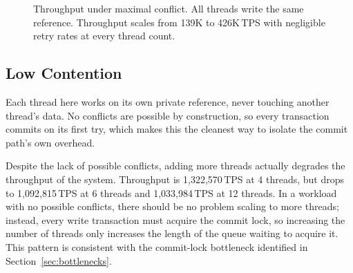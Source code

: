 \begin{figure}[H]
  \centering
  \caption{Throughput under maximal conflict. All threads write the same
    reference. Throughput scales from 139K to 426K\,TPS with negligible
    retry rates at every thread count.}
  \label{fig:throughput-high-contention}
\end{figure}

\subsection{Low Contention}

Each thread here works on its own private reference, never touching another
thread's data. No conflicts are possible by construction, so every
transaction commits on its first try, which makes this the cleanest way to
isolate the commit path's own overhead.

Despite the lack of possible conflicts, adding more threads actually
degrades the throughput of the system. Throughput is 1,322,570\,TPS at
4 threads, but drops to 1,092,815\,TPS at 6 threads and 1,033,984\,TPS
at 12 threads. In a workload with no possible conflicts, there should be
no problem scaling to more threads; instead, every write transaction must
acquire the commit lock, so increasing the number of threads only
increases the length of the queue waiting to acquire it. This pattern is
consistent with the commit-lock bottleneck identified in
Section~\ref{sec:bottlenecks}.

